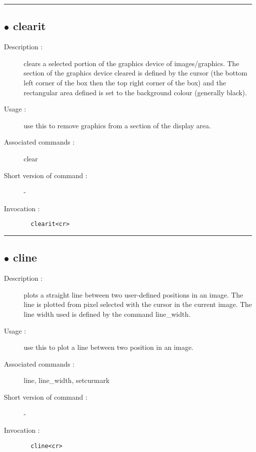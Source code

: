 \hrule \subsection*{$\bullet$ clearit}
\begin{description}
\item[Description :] clears a selected portion of the graphics device of
images/graphics. The section of the graphics device cleared is defined by
the cursor (the bottom left corner of the box then the top right corner
of the box) and the rectangular area defined is set to the background
colour (generally black).
\item[Usage :] use this to remove graphics from a section of the display area.
\item[Associated commands :] clear
\item[Short version of command :] -
\item[Invocation :]

\verb+  clearit<cr> +\end{description}

\hrule \subsection*{$\bullet$ cline}
\begin{description}
\item[Description :] plots a straight line between two user-defined positions in an
image.  The line is plotted from pixel selected with the cursor in the
current image.  The line width used is defined by the command line\_width.
\item[Usage :] use this to plot a line between two position in an image.
\item[Associated commands :] line, line\_width, setcurmark
\item[Short version of command :] -
\item[Invocation :]

\verb+  cline<cr> +\end{description}

